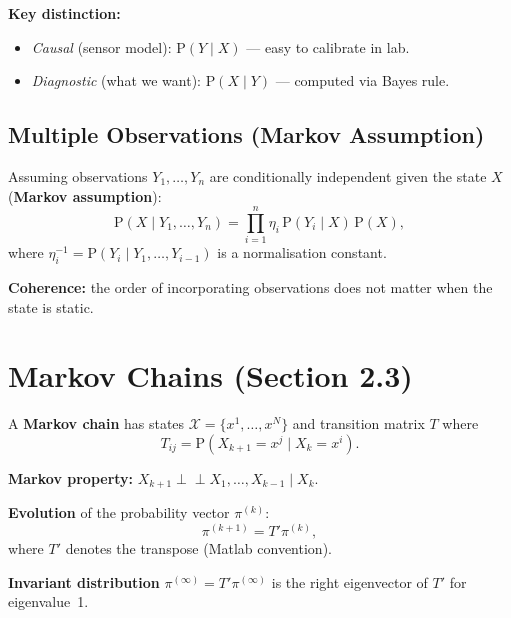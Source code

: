 \documentclass[12pt, a4paper]{article}
\begin{document}
\textbf{Key distinction:}
\begin{itemize}
  \item \emph{Causal} (sensor model): $\mathrm{P}(Y\mid X)$ --- easy to calibrate in lab.
  \item \emph{Diagnostic} (what we want): $\mathrm{P}(X\mid Y)$ --- computed via Bayes rule.
\end{itemize}

\subsection{Multiple Observations (Markov Assumption)}

Assuming observations $Y_1,\ldots,Y_n$ are conditionally independent
given the state $X$ (\textbf{Markov assumption}):
\begin{equation}
  \mathrm{P}(X\mid Y_1,\ldots,Y_n) = \prod_{i=1}^{n}\eta_i\,\mathrm{P}(Y_i\mid X)\,\mathrm{P}(X),
  \label{eq:multi_obs}
\end{equation}
where $\eta_i^{-1}=\mathrm{P}(Y_i\mid Y_1,\ldots,Y_{i-1})$ is a
normalisation constant.

\textbf{Coherence:} the order of incorporating observations does not
matter when the state is static.

\section{Markov Chains (Section 2.3)}

A \textbf{Markov chain} has states $\mathcal{X}=\{x^1,\ldots,x^N\}$ and
transition matrix $T$ where
\begin{equation}
  T_{ij} = \mathrm{P}(X_{k+1}=x^j\mid X_k=x^i).
\end{equation}

\textbf{Markov property:} $X_{k+1}\perp\!\!\!\perp X_1,\ldots,X_{k-1}\mid X_k$.

\textbf{Evolution} of the probability vector $\pi^{(k)}$:
\begin{equation}
  \pi^{(k+1)} = T'\pi^{(k)},
  \label{eq:mc_evolve}
\end{equation}
where $T'$ denotes the transpose (Matlab convention).

\textbf{Invariant distribution} $\pi^{(\infty)}=T'\pi^{(\infty)}$ is
the right eigenvector of $T'$ for eigenvalue~1.

\end{document}
